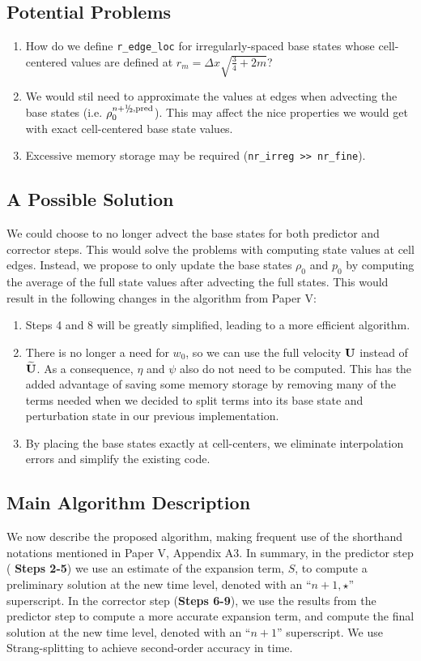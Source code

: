 \documentclass{aastex62}
\newcommand{\sfrac}[2]{\mathchoice
  {\kern0em\raise.5ex\hbox{\the\scriptfont0 #1}\kern-.15em/
   \kern-.15em\lower.25ex\hbox{\the\scriptfont0 #2}}
  {\kern0em\raise.5ex\hbox{\the\scriptfont0 #1}\kern-.15em/
   \kern-.15em\lower.25ex\hbox{\the\scriptfont0 #2}}
  {\kern0em\raise.5ex\hbox{\the\scriptscriptfont0 #1}\kern-.2em/
   \kern-.15em\lower.25ex\hbox{\the\scriptscriptfont0 #2}}
  {#1\!/#2}}
\newcommand{\myhalf}{\sfrac{1}{2}}
\newcommand{\Ub}{{\bf{U}}}
\newcommand{\Ubt}{\widetilde{\Ub}}
\newcommand{\pred}{{\rm pred}}
\newcommand{\nph}{{n+\myhalf}}
\begin{document}
\subsection{Potential Problems}
\begin{enumerate}
\item How do we define \verb|r_edge_loc| for irregularly-spaced base states whose cell-centered values are defined at $r_m=\Delta x\sqrt{\frac{3}{4} + 2m}$?
\item We would stil need to approximate the values at edges when advecting the base states (i.e. $\rho_0^{\nph,\pred}$). This may affect the nice properties we would get with exact cell-centered base state values.
\item Excessive memory storage may be required (\verb|nr_irreg >> nr_fine|).
\end{enumerate}

\subsection{A Possible Solution}
We could choose to no longer advect the base states for both predictor and corrector steps. This would solve the problems with computing state values at cell edges. Instead, we propose to only update the base states $\rho_0$ and $p_0$ by computing the average of the full state values after advecting the full states. This would result in the following changes in the algorithm from Paper V:
%
\begin{enumerate}
\item Steps 4 and 8 will be greatly simplified, leading to a more efficient algorithm.
\item There is no longer a need for $w_0$, so we can use the full velocity $\Ub$ instead of $\Ubt$. As a consequence, $\eta$ and $\psi$ also do not need to be computed. This has the added advantage of saving some memory storage by removing many of the terms needed when we decided to split terms into its base state and perturbation state in our previous implementation.
\item By placing the base states exactly at cell-centers, we eliminate interpolation errors and simplify the existing code.
\end{enumerate}
%

\subsection{Main Algorithm Description}\label{Sec:Main Algorithm Description}
We now describe the proposed algorithm, making frequent use of the
shorthand notations mentioned in Paper V, Appendix A3.  In summary, in the predictor step ({\bf
  Steps 2-5}) we use an estimate of the expansion term, $S$, to
compute a preliminary solution at the new time level, denoted with an
``$n+1,\star$'' superscript.  In the corrector step ({\bf Steps 6-9}),
we use the results from the predictor step to compute a more accurate
expansion term, and compute the final solution at the new time level,
denoted with an ``$n+1$'' superscript.  We use Strang-splitting to
achieve second-order accuracy in time.
\end{document}
